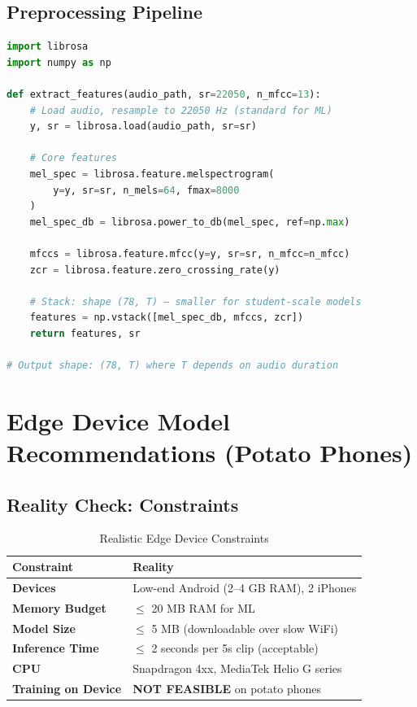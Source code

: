 \documentclass[11pt,a4paper]{article}
\begin{document}
\subsection{Preprocessing Pipeline}

\begin{lstlisting}[language=Python]
import librosa
import numpy as np

def extract_features(audio_path, sr=22050, n_mfcc=13):
    # Load audio, resample to 22050 Hz (standard for ML)
    y, sr = librosa.load(audio_path, sr=sr)
    
    # Core features
    mel_spec = librosa.feature.melspectrogram(
        y=y, sr=sr, n_mels=64, fmax=8000
    )
    mel_spec_db = librosa.power_to_db(mel_spec, ref=np.max)
    
    mfccs = librosa.feature.mfcc(y=y, sr=sr, n_mfcc=n_mfcc)
    zcr = librosa.feature.zero_crossing_rate(y)
    
    # Stack: shape (78, T) — smaller for student-scale models
    features = np.vstack([mel_spec_db, mfccs, zcr])
    return features, sr

# Output shape: (78, T) where T depends on audio duration
\end{lstlisting}

\section{Edge Device Model Recommendations (Potato Phones)}

\subsection{Reality Check: Constraints}

\begin{table}[h]
\centering
\caption{Realistic Edge Device Constraints}
\begin{tabular}{@{}p{4cm}p{8cm}@{}}
\toprule
\textbf{Constraint} & \textbf{Reality} \\
\midrule
\textbf{Devices} & Low-end Android (2--4 GB RAM), 2 iPhones \\
\textbf{Memory Budget} & $\leq$ 20 MB RAM for ML \\
\textbf{Model Size} & $\leq$ 5 MB (downloadable over slow WiFi) \\
\textbf{Inference Time} & $\leq$ 2 seconds per 5s clip (acceptable) \\
\textbf{CPU} & Snapdragon 4xx, MediaTek Helio G series \\
\textbf{Training on Device} & \textbf{NOT FEASIBLE} on potato phones \\
\bottomrule
\end{tabular}
\end{table}
\end{document}
